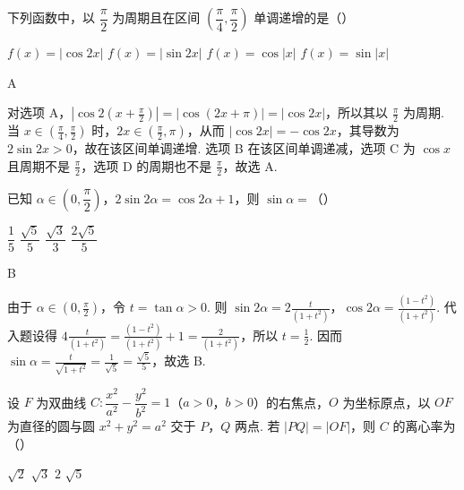 \begin{problem}
下列函数中，以 \(\dfrac{\pi}{2}\) 为周期且在区间 \(\left(\dfrac{\pi}{4},\dfrac{\pi}{2}\right)\) 单调递增的是（\quad）

\choices
    {\(f(x)=|\cos 2x|\)}
    {\(f(x)=|\sin 2x|\)}
    {\(f(x)=\cos|x|\)}
    {\(f(x)=\sin|x|\)}
\end{problem}

\begin{answer}
A
\end{answer}

\begin{solution}
对选项 A，\(|\cos 2(x+\frac{\pi}{2})|=|\cos(2x+\pi)|=|\cos2x|\)，所以其以 \(\frac{\pi}{2}\) 为周期. 当 \(x\in(\frac{\pi}{4},\frac{\pi}{2})\) 时，\(2x\in(\frac{\pi}{2},\pi)\)，从而 \(|\cos2x|=-\cos2x\)，其导数为 \(2\sin2x>0\)，故在该区间单调递增. 选项 B 在该区间单调递减，选项 C 为 \(\cos x\) 且周期不是 \(\frac{\pi}{2}\)，选项 D 的周期也不是 \(\frac{\pi}{2}\)，故选 A.
\end{solution}

\begin{problem}
已知 \(\alpha\in\left(0,\dfrac{\pi}{2}\right)\)，\(2\sin2\alpha=\cos2\alpha+1\)，则 \(\sin\alpha=\)（\quad）

\choices
    {\(\dfrac15\)}
    {\(\dfrac{\sqrt5}{5}\)}
    {\(\dfrac{\sqrt3}{3}\)}
    {\(\dfrac{2\sqrt5}{5}\)}
\end{problem}

\begin{answer}
B
\end{answer}

\begin{solution}
由于 \(\alpha\in(0,\frac{\pi}{2})\)，令 \(t=\tan\alpha>0\). 则 \(\sin2\alpha=2\frac{t}{(1+t^2)}\)，\(\cos2\alpha=\frac{(1-t^2)}{(1+t^2)}\). 代入题设得 \(4\frac{t}{(1+t^2)}=\frac{(1-t^2)}{(1+t^2)}+1=\frac{2}{(1+t^2)}\)，所以 \(t=\frac{1}{2}\). 因而 \(\sin\alpha=\frac{t}{\sqrt{1+t^2}}=\frac{1}{\sqrt5}=\frac{\sqrt5}{5}\)，故选 B.
\end{solution}

\begin{problem}
设 \(F\) 为双曲线 \(C:\dfrac{x^2}{a^2}-\dfrac{y^2}{b^2}=1\)（\(a>0\)，\(b>0\)）的右焦点，\(O\) 为坐标原点，以 \(OF\) 为直径的圆与圆 \(x^2+y^2=a^2\) 交于 \(P\)，\(Q\) 两点. 若 \(|PQ|=|OF|\)，则 \(C\) 的离心率为（\quad）

\choices
    {\(\sqrt2\)}
    {\(\sqrt3\)}
    {\(2\)}
    {\(\sqrt5\)}
\end{problem}

